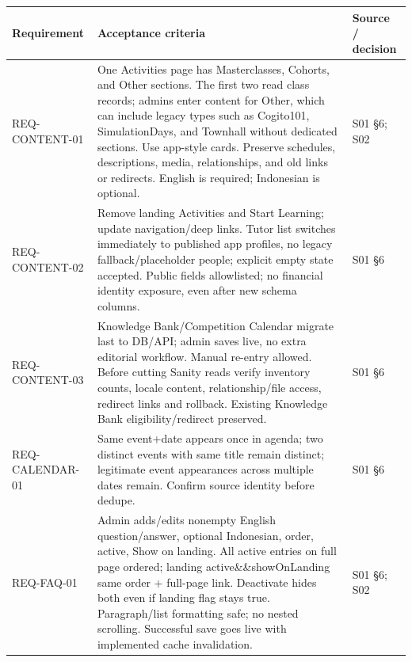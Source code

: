 \documentclass[11pt,a4paper]{article}
\newcounter{none}
\begin{document}
{\def\LTcaptype{none} %
\begin{longtable}[]{@{}
  >{\raggedright\arraybackslash}p{}
  >{\raggedright\arraybackslash}p{}
  >{\raggedright\arraybackslash}p{}@{}}
\toprule\noalign{}
\begin{minipage}[b]{\linewidth}\raggedright
Requirement
\end{minipage} & \begin{minipage}[b]{\linewidth}\raggedright
Acceptance criteria
\end{minipage} & \begin{minipage}[b]{\linewidth}\raggedright
Source / decision
\end{minipage} \\
\midrule\noalign{}
\endhead
\bottomrule\noalign{}
\endlastfoot
REQ-CONTENT-01 & One Activities page has Masterclasses, Cohorts, and Other sections. The first two read class records; admins enter content for Other, which can include legacy types such as Cogito101, SimulationDays, and Townhall without dedicated sections. Use app-style cards. Preserve schedules, descriptions, media, relationships, and old links or redirects. English is required; Indonesian is optional. & S01 §6; S02 \\
REQ-CONTENT-02 & Remove landing Activities and Start Learning; update navigation/deep links. Tutor list switches immediately to published app profiles, no legacy fallback/placeholder people; explicit empty state accepted. Public fields allowlisted; no financial identity exposure, even after new schema columns. & S01 §6 \\
REQ-CONTENT-03 & Knowledge Bank/Competition Calendar migrate last to DB/API; admin saves live, no extra editorial workflow. Manual re-entry allowed. Before cutting Sanity reads verify inventory counts, locale content, relationship/file access, redirect links and rollback. Existing Knowledge Bank eligibility/redirect preserved. & S01 §6 \\
REQ-CALENDAR-01 & Same event+date appears once in agenda; two distinct events with same title remain distinct; legitimate event appearances across multiple dates remain. Confirm source identity before dedupe. & S01 §6 \\
REQ-FAQ-01 & Admin adds/edits nonempty English question/answer, optional Indonesian, order, active, Show on landing. All active entries on full page ordered; landing active\&\&showOnLanding same order + full-page link. Deactivate hides both even if landing flag stays true. Paragraph/list formatting safe; no nested scrolling. Successful save goes live with implemented cache invalidation. & S01 §6; S02 \\

\end{longtable}}
\end{document}
